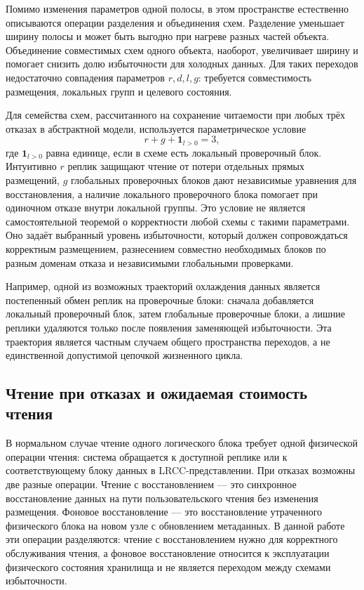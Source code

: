 Помимо изменения параметров одной полосы, в этом пространстве естественно
описываются операции разделения и объединения схем. Разделение уменьшает ширину
полосы и может быть выгодно при нагреве разных частей объекта. Объединение
совместимых схем одного объекта, наоборот, увеличивает ширину и помогает
снизить долю избыточности для холодных данных. Для таких переходов недостаточно
совпадения параметров \(r,d,l,g\): требуется совместимость размещения,
локальных групп и целевого состояния.

Для семейства схем, рассчитанного на сохранение читаемости при любых трёх
отказах в абстрактной модели, используется параметрическое условие
\[
    r + g + \mathbf{1}_{l>0} = 3,
\]
где \(\mathbf{1}_{l>0}\) равна единице, если в схеме есть локальный
проверочный блок. Интуитивно \(r\) реплик защищают чтение от потери отдельных прямых
размещений, \(g\) глобальных проверочных блоков дают независимые уравнения для
восстановления, а наличие локального проверочного блока помогает при одиночном отказе
внутри локальной группы. Это условие не является самостоятельной теоремой о
корректности любой схемы с такими параметрами. Оно задаёт выбранный уровень
избыточности, который должен сопровождаться корректным размещением,
разнесением совместно необходимых блоков по разным доменам отказа и
независимыми глобальными проверками.

Например, одной из возможных траекторий охлаждения данных является постепенный
обмен реплик на проверочные блоки: сначала добавляется локальный проверочный
блок, затем глобальные проверочные блоки, а лишние реплики удаляются
только после появления
заменяющей избыточности. Эта траектория является частным случаем общего
пространства переходов, а не единственной допустимой цепочкой жизненного цикла.

\subsection{Чтение при отказах и ожидаемая стоимость чтения}
\label{sec:theory-read-cost}

В нормальном случае чтение одного логического блока требует одной
физической операции чтения: система обращается к доступной реплике или к
соответствующему блоку данных в LRCC-представлении. При отказах возможны
две разные операции. Чтение с восстановлением --- это синхронное восстановление
данных на пути пользовательского чтения без изменения размещения. Фоновое
восстановление --- это восстановление утраченного физического блока на
новом узле с обновлением метаданных. В данной работе эти операции
разделяются: чтение с восстановлением нужно для корректного обслуживания
чтения, а фоновое восстановление относится к эксплуатации физического состояния
хранилища и не является переходом между схемами избыточности.

